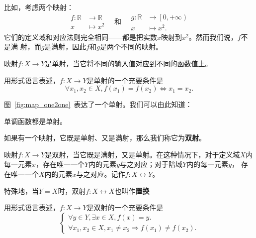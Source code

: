 比如，考虑两个映射：
\[
    \begin{aligned}
        f: \mathbb{R} &\to \mathbb{R}\\
        x &\mapsto x^2
    \end{aligned}
    \quad \text{和}\quad
    \begin{aligned}
        g: \mathbb{R} &\to \left[ 0,+\infty \right)\\
        x &\mapsto x^2.
    \end{aligned}
\]
它们的定义域和对应法则完全相同——都是把实数$x$映射到$x^2$。然而我们说，$f$不是满
射，而$g$是满射，因此$f$和$g$是两个不同的映射。

\begin{rawdef}[单射]
    映射$f: X\to Y$是单射，当它将不同的输入值对应到不同的函数值上。

    用形式语言表述，$f: X\to Y$是单射的一个充要条件是
    \[
        \forall x_{1},x_{2} \in X, f\left(x_{1}\right)=f\left(x_{2}\right) 
        \Leftrightarrow x_{1}=x_{2}
        .
    \]
\end{rawdef}

图~\ref{fig:map_one2one}~表达了一个单射。我们可以由此知道：
\begin{rawthm}\label{thm:monotone_one2one}
    单调函数都是单射。
\end{rawthm}

如果有一个映射，它既是单射、又是满射，那么我们称它为\textbf{双射}。

\begin{rawdef}[双射]
    映射$f:X\to Y$是双射，当它既是满射，又是单射。在这种情况下，对于定义域$X$内
    每一元素$x$，存在唯一一个$Y$内的元素$y$与之对应；对于陪域$Y$内的每一元素$y$，
    存在唯一一个$X$内的元素$x$与之对应。记作$f: X\leftrightarrow Y$。

    特殊地，当$Y=X$时，双射$f: X\leftrightarrow X$也叫作\textbf{置换}

    用形式语言表述，$f: X\to Y$是双射的一个充要条件是
    \[
        \left\{
        \begin{matrix}
            \forall y \in Y, \exists x \in X, f(x)=y.\\
            \forall x_{1},x_{2}\in X, x_{1}\neq x_{2}\Rightarrow f(x_{1})\neq f(x_{2}).
        \end{matrix}
        \right.
    \]
\end{rawdef}

